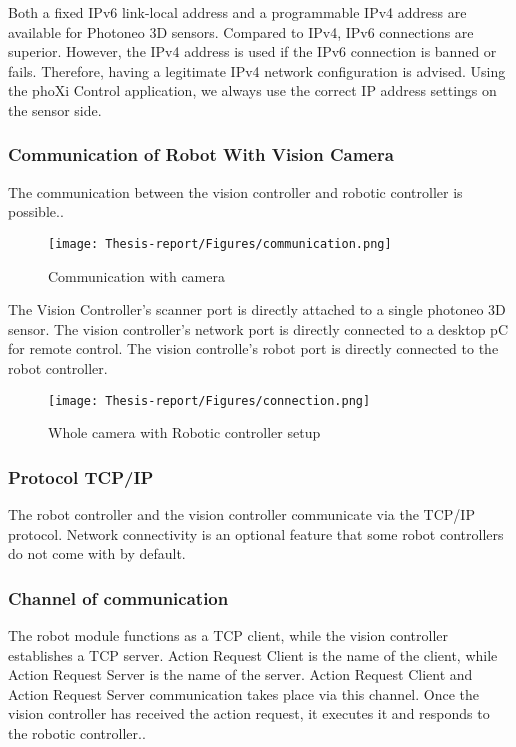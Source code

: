 \documentclass[12pt]{article}
\begin{document}
Both a fixed IPv6 link-local address and a programmable IPv4 address are available for Photoneo 3D sensors. Compared to IPv4, IPv6 connections are superior.  However, the IPv4 address is used if the IPv6 connection is banned or fails.   Therefore, having a legitimate IPv4 network configuration is advised.  Using the phoXi Control application, we always use the correct IP address settings on the sensor side\cite{ref2}.\\

\subsubsection{Communication of Robot With Vision Camera}
The communication between the vision controller and robotic controller is possible.\cite{ref2}.\\
\begin{figure}[h]
    \centering
    \texttt{[image: Thesis-report/Figures/communication.png]}
    \caption{Communication with camera \cite{ref2}}
    \label{fig:camera-comms}
\end{figure}

The Vision Controller's scanner port is directly attached to a single photoneo 3D sensor. 
The vision controller's network port is directly connected to a desktop pC for remote control.
The vision controlle's robot port is directly connected to the robot controller\cite{ref2}.

\begin{figure}[h]
    \centering
    \texttt{[image: Thesis-report/Figures/connection.png]}
    \caption{Whole camera with Robotic controller setup\cite{ref2}}
    \label{fig:whole-camera}
\end{figure}

\newpage
 \subsubsection{Protocol TCP/IP}
The robot controller and the vision controller communicate via the TCP/IP protocol. Network connectivity is an optional feature that some robot controllers do not come with by default\cite{ref2}.

\subsubsection{Channel of communication}
The robot module functions as a TCP client, while the vision controller establishes a TCP server. Action Request Client is the name of the client, while Action Request Server is the name of the server.   Action Request Client and Action Request Server communication takes place via this channel.  Once the vision controller has received the action request, it executes it and responds to the robotic controller.\cite{ref2}.
\end{document}
